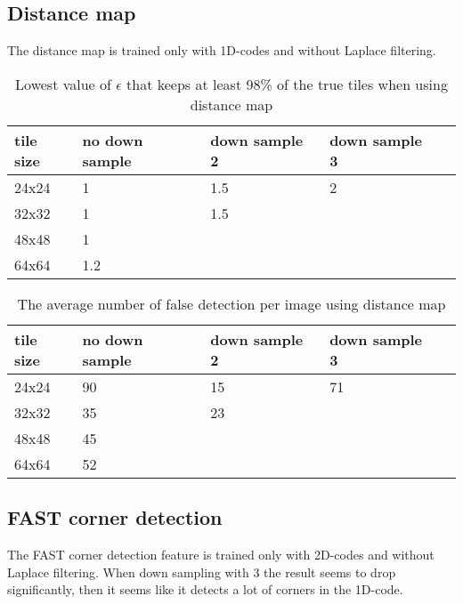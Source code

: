 \subsection{Distance map}
The distance map is trained only with 1D-codes and without Laplace filtering.

\begin{table}[H]
\begin{center}
     \begin{tabular}{ | l | l | l | l | l |}
     \hline
     tile size & no down sample & down sample 2 & down sample 3 \\ \hline
   	 24x24 & 1 & 1.5 & 2 		\\ \hline
     32x32 & 1 & 1.5  & 		\\ \hline
     48x48 & 1 &     &  		\\ \hline
     64x64 & 1.2 &     &		\\ \hline
     \end{tabular}
\end{center}
\caption{Lowest value of $\epsilon$ that keeps at least 98\% of the true tiles when using distance map}
\end{table}

\begin{table}[H]
\begin{center}
     \begin{tabular}{ | l | l | l | l | l |}
     \hline
     tile size & no down sample & down sample 2 & down sample 3 \\ \hline
   	 24x24 & 90 & 15 & 71 	    \\ \hline
     32x32 & 35 & 23 & 			\\ \hline
     48x48 & 45    &     &  	\\ \hline
     64x64 & 52     &     &		\\ \hline
     \end{tabular}
\end{center}
\caption{The average number of false detection per image using distance map}
\end{table}


\subsection{FAST corner detection}
The FAST corner detection feature is trained only with 2D-codes and without Laplace filtering. When down sampling with 3 the result seems to drop significantly, then it seems like it detects a lot of corners in the 1D-code.

